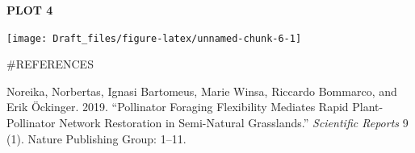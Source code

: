 \documentclass[12pt,]{article}
\begin{document}
\newpage

\textbf{PLOT 4}

\begin{center}\texttt{[image: Draft\_files/figure-latex/unnamed-chunk-6-1]} \end{center}

\#REFERENCES

\hypertarget{refs}{}
\leavevmode\hypertarget{ref-noreika2019pollinator}{}%
Noreika, Norbertas, Ignasi Bartomeus, Marie Winsa, Riccardo Bommarco,
and Erik Öckinger. 2019. ``Pollinator Foraging Flexibility Mediates
Rapid Plant-Pollinator Network Restoration in Semi-Natural Grasslands.''
\emph{Scientific Reports} 9 (1). Nature Publishing Group: 1--11.
\end{document}
